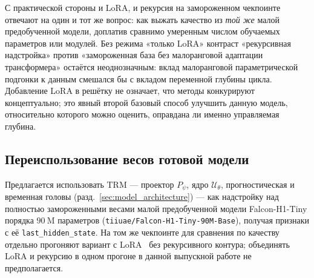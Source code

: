 С практической стороны и LoRA, и рекурсия на замороженном чекпоинте отвечают на один и тот же
вопрос: как выжать качество из \emph{той же} малой предобученной модели, доплатив сравнимо
умеренным числом обучаемых параметров или модулей. Без режима «только LoRA» контраст «рекурсивная
надстройка» против «замороженная база без малоранговой адаптации трансформера» остаётся
неоднозначным: вклад малоранговой параметрической подгонки к данным смешался бы с вкладом
переменной глубины цикла. Добавление LoRA в решётку не означает, что методы конкурируют
концептуально; это явный второй базовый способ улучшить данную модель, относительно которого можно
оценить, оправдана ли именно управляемая глубина.


\subsection{Переиспользование весов готовой модели}

Предлагается использовать TRM --- проектор \(P_{\psi}\), ядро \(\mathcal U_{\theta}\),
прогностическая и временная головы (разд.~\ref{sec:model_architecture}) --- как надстройку над
полностью замороженными весами малой предобученной модели Falcon-H1-Tiny порядка \(90~\mathrm{M}\)
параметров (\texttt{tiiuae/Falcon-H1-Tiny-90M-Base}), получая признаки с её
\texttt{last\_hidden\_state}. На том же чекпоинте для сравнения по качеству отдельно прогоняют
вариант с LoRA~\cite{hu2021} без рекурсивного контура; объединять LoRA и рекурсию в одном прогоне
в данной выпускной работе не предполагается.

